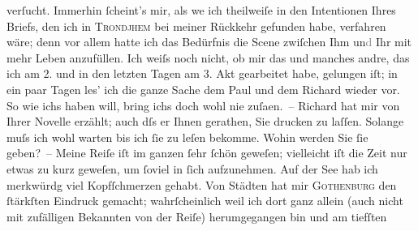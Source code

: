 \begin{ledgroupsized}[t]{13cm}
               verſucht. Immerhin ſcheint’s mir, als we{\geminationn} ich theilweiſe
               in den Intentionen Ihres Briefs, den ich in \textsc{Trondjhem} bei meiner Rückkehr gefunden habe, verfahren wäre; denn vor allem hatte ich das
               Bedürfnis die Scene zwiſchen Ihm un\textcolor{gray}{d} Ihr mit mehr Leben
               anzufüllen. Ich weiſs noch nicht, ob mir das {\pb}und manches
               andre, das ich am 2. und in
               den letzten Tagen am 3. Akt
               gearbeitet habe, gelungen iſt; in ein paar Tagen les’ ich die ganze Sache dem Paul und dem Richard wieder vor. So wie ichs haben will, bring ichs doch wohl nie zuſa{\geminationm}en. –\pend
           \pstart
           Richard hat mir von Ihrer Novelle erzählt; auch dſs er Ihnen gerathen,
               Sie drucken zu laſſen. Solange muſs ich wohl warten bis ich ſie zu leſen
               bekomme. Wohin werden Sie ſie geben? –\pend
           \pstart
           Meine Reiſe iſt im ganzen ſehr ſchön geweſen; vielleicht iſt die Zeit nur {\pb}etwas zu kurz geweſen, um ſoviel in ſich aufzunehmen.\pend
           \pstart
           Auf der See hab ich merkwürdg viel Kopfſchmerzen gehabt. Von Städten hat mir \textsc{Gothenburg} den ſtärkſten Eindruck gemacht; wahrſcheinlich weil ich dort ganz allein (auch
               nicht mit zufälligen Bekannten von der Reiſe) herumgegangen bin und am tiefſten

\end{ledgroupsized}
